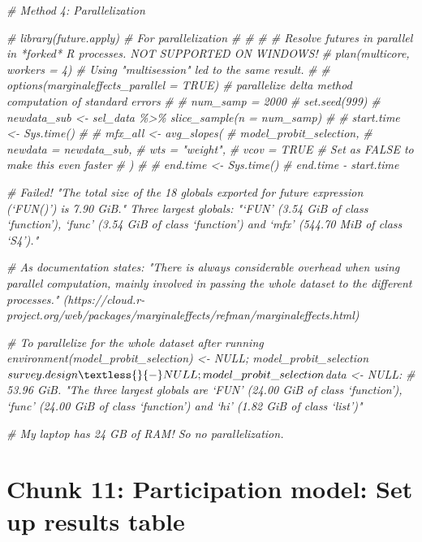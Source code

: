 \documentclass[
]{article}
\newenvironment{Shaded}{\begin{snugshade}}{\end{snugshade}}
\newcommand{\CommentTok}[1]{\textcolor[rgb]{0.56,0.35,0.01}{\textit{#1}}}
\begin{document}
\begin{Shaded}
\begin{Highlighting}[]
\CommentTok{\# Method 4: Parallelization}

\CommentTok{\# library(future.apply) \# For parallelization}
\CommentTok{\# \# }
\CommentTok{\# \# Resolve futures in parallel in *forked* R processes. NOT SUPPORTED ON WINDOWS!}
\CommentTok{\# plan(multicore, workers = 4) \# Using "multisession" led to the same result.}
\CommentTok{\# }
\CommentTok{\# options(marginaleffects\_parallel = TRUE) \# parallelize delta method computation of standard errors}
\CommentTok{\# }
\CommentTok{\# num\_samp = 2000}
\CommentTok{\# set.seed(999)}
\CommentTok{\# newdata\_sub \textless{}{-} sel\_data \%\textgreater{}\% slice\_sample(n = num\_samp)}
\CommentTok{\# }
\CommentTok{\# start.time \textless{}{-} Sys.time()}
\CommentTok{\# }
\CommentTok{\# mfx\_all \textless{}{-} avg\_slopes(}
\CommentTok{\#   model\_probit\_selection,}
\CommentTok{\#   newdata = newdata\_sub,}
\CommentTok{\#   wts = "weight",}
\CommentTok{\#   vcov = TRUE \# Set as FALSE to make this even faster}
\CommentTok{\# )}
\CommentTok{\# }
\CommentTok{\# end.time \textless{}{-} Sys.time()}
\CommentTok{\# end.time {-} start.time}

\CommentTok{\# Failed! "The total size of the 18 globals exported for future expression (‘FUN()’) is 7.90 GiB." Three largest globals: "‘FUN’ (3.54 GiB of class ‘function’), ‘func’ (3.54 GiB of class ‘function’) and ‘mfx’ (544.70 MiB of class ‘S4’)."}

\CommentTok{\# As documentation states: "There is always considerable overhead when using parallel computation, mainly involved in passing the whole dataset to the different processes." (https://cloud.r{-}project.org/web/packages/marginaleffects/refman/marginaleffects.html)}


\CommentTok{\# To parallelize for the whole dataset after running \textasciigrave{}environment(model\_probit\_selection) \textless{}{-} NULL; model\_probit\_selection$survey.design \textless{}{-} NULL; model\_probit\_selection$data \textless{}{-} NULL\textasciigrave{}: }
\CommentTok{\# 53.96 GiB. "The three largest globals are ‘FUN’ (24.00 GiB of class ‘function’), ‘func’ (24.00 GiB of class ‘function’) and ‘hi’ (1.82 GiB of class ‘list’)"}

\CommentTok{\# My laptop has 24 GB of RAM! So no parallelization.}
\end{Highlighting}
\end{Shaded}

\section*{Chunk 11: Participation model: Set up results table}\label{chunk-11-participation-model-set-up-results-table}
\end{document}
